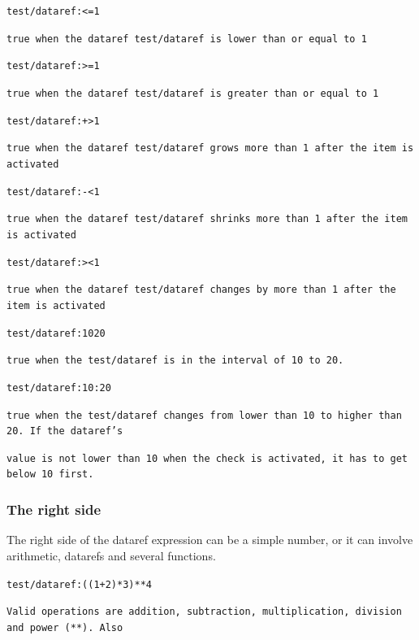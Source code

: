 \documentclass[11pt,parskip=half,a4paper]{scrartcl}
\newcommand\textstyleSourceText[1]{\texttt{#1}}
\begin{document}
\textstyleSourceText{test/dataref:{\textless}=1}

{\ttfamily
\textstyleSourceText{true when the dataref {\textquotedbl}test/dataref{\textquotedbl} is lower than or equal to 1}}

\textstyleSourceText{test/dataref:{\textgreater}=1}

{\ttfamily
\textstyleSourceText{true when the dataref {\textquotedbl}test/dataref{\textquotedbl} is greater than or equal to 1}}

\textstyleSourceText{test/dataref:+{\textgreater}1}

{\ttfamily
\textstyleSourceText{true when the dataref {\textquotedbl}test/dataref{\textquotedbl} grows more than 1 after the item
is activated}}

\textstyleSourceText{test/dataref:-{\textless}1}

{\ttfamily
\textstyleSourceText{true when the dataref {\textquotedbl}test/dataref{\textquotedbl} shrinks more than 1 after the item is activated}}

\textstyleSourceText{test/dataref:{\textgreater}{\textless}1}

{\ttfamily
\textstyleSourceText{true when the dataref {\textquotedbl}test/dataref{\textquotedbl} changes by more than 1 after the item is activated}}

\textstyleSourceText{test/dataref:10{\textbar}20}

{\ttfamily
\textstyleSourceText{true when the {\textquotedbl}test/dataref{\textquotedbl} is in the interval of 10 to 20.}}

\textstyleSourceText{test/dataref:10:20}

{\ttfamily
\textstyleSourceText{true when the {\textquotedbl}test/dataref{\textquotedbl} changes from lower than 10 to higher than 20. If the dataref's}}

{\ttfamily
\textstyleSourceText{value is not lower than 10 when the check is activated, it has to get below 10 first.}}

\subsubsection[The right side]{The right side}
The right side of the dataref expression can be a simple number, or it can involve arithmetic, datarefs and several functions.

\textstyleSourceText{test/dataref:((1+2)*3)**4}

{\ttfamily
\textstyleSourceText{Valid operations are addition, subtraction, multiplication, division and power (**). Also}}
\end{document}
